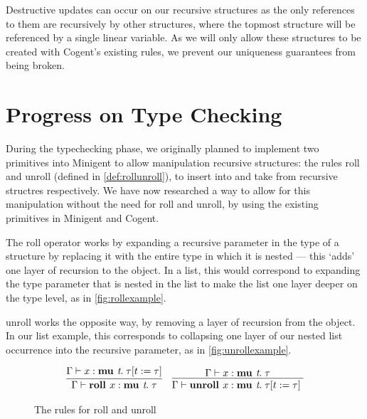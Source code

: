 Destructive updates can occur on our recursive structures as the only references to them are
recursively by other structures, where the topmost structure will be referenced by a single linear
variable. As we will only allow these structures to be created with Cogent's existing rules,
we prevent our uniqueness guarantees from being broken.

\section{Progress on Type Checking}
\label{sec:typecheckingprogress}

During the typechecking phase, we originally planned to implement two primitives into Minigent to allow manipulation
recursive structures: the rules \textsf{roll} and \textsf{unroll} (defined in \autoref{def:rollunroll}),
to insert into and take from recursive structres respectively. We have now researched a way to allow
for this manipulation without the need for \textsf{roll} and \textsf{unroll}, by using the existing primitives
in Minigent and Cogent.

The \textsf{roll} operator works by expanding a recursive parameter 
in the type of a structure by replacing it with the entire type in which it is nested --- this `adds' one 
layer of recursion to the object. In a list, this would correspond to expanding the type parameter
that is nested in the list to make the list one layer deeper on the type level, as in \autoref{fig:rollexample}.

\textsf{unroll} works the opposite way, by removing a layer of recursion from the object. In our
list example, this corresponds to collapsing one layer of our nested list occurrence into the
recursive parameter, as in \autoref{fig:unrollexample}. 

\begin{figure}
    \centering
    \begin{align*}
        \infer{
            \Gamma \vdash \textbf{roll } x : \textbf{mu } \textit{t}.\; \tau
        }{
            \Gamma \vdash x : \textbf{mu } \textit{t}.\; \tau[ t := \tau]
        }
        && \infer{
            \Gamma \vdash \textbf{unroll } x : \textbf{mu } \textit{t}.\; \tau[ t := \tau]\; 
        }{
            \Gamma \vdash x : \textbf{mu } \textit{t}.\; \tau
        }
    \end{align*}
    \caption{The rules for roll and unroll}
    \label{def:rollunroll}
\end{figure}

